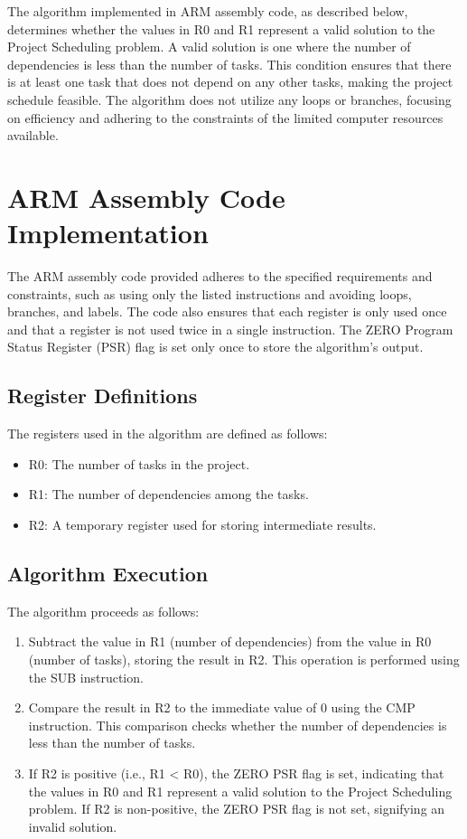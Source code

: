 The algorithm implemented in ARM assembly code, as described below, determines whether the values in R0 and R1 represent a valid solution to the Project Scheduling problem. A valid solution is one where the number of dependencies is less than the number of tasks. This condition ensures that there is at least one task that does not depend on any other tasks, making the project schedule feasible. The algorithm does not utilize any loops or branches, focusing on efficiency and adhering to the constraints of the limited computer resources available.

\section{ARM Assembly Code Implementation}

The ARM assembly code provided adheres to the specified requirements and constraints, such as using only the listed instructions and avoiding loops, branches, and labels. The code also ensures that each register is only used once and that a register is not used twice in a single instruction. The ZERO Program Status Register (PSR) flag is set only once to store the algorithm's output.

\subsection{Register Definitions}

The registers used in the algorithm are defined as follows:

\begin{itemize}
  \item R0: The number of tasks in the project.
  \item R1: The number of dependencies among the tasks.
  \item R2: A temporary register used for storing intermediate results.
\end{itemize}

\subsection{Algorithm Execution}

The algorithm proceeds as follows:

\begin{enumerate}
  \item Subtract the value in R1 (number of dependencies) from the value in R0 (number of tasks), storing the result in R2. This operation is performed using the SUB instruction.
  \item Compare the result in R2 to the immediate value of 0 using the CMP instruction. This comparison checks whether the number of dependencies is less than the number of tasks.
  \item If R2 is positive (i.e., R1 < R0), the ZERO PSR flag is set, indicating that the values in R0 and R1 represent a valid solution to the Project Scheduling problem. If R2 is non-positive, the ZERO PSR flag is not set, signifying an invalid solution.
\end{enumerate}

